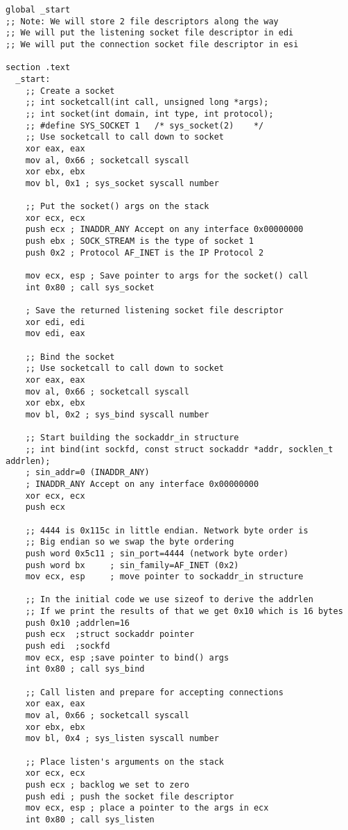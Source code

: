 \documentclass[11pt]{article}
\begin{document}
\begin{verbatim}
global _start
;; Note: We will store 2 file descriptors along the way
;; We will put the listening socket file descriptor in edi
;; We will put the connection socket file descriptor in esi

section .text
  _start:
    ;; Create a socket
    ;; int socketcall(int call, unsigned long *args);
    ;; int socket(int domain, int type, int protocol);
    ;; #define SYS_SOCKET 1   /* sys_socket(2)    */
    ;; Use socketcall to call down to socket
    xor eax, eax
    mov al, 0x66 ; socketcall syscall
    xor ebx, ebx
    mov bl, 0x1 ; sys_socket syscall number

    ;; Put the socket() args on the stack
    xor ecx, ecx
    push ecx ; INADDR_ANY Accept on any interface 0x00000000
    push ebx ; SOCK_STREAM is the type of socket 1
    push 0x2 ; Protocol AF_INET is the IP Protocol 2

    mov ecx, esp ; Save pointer to args for the socket() call
    int 0x80 ; call sys_socket

    ; Save the returned listening socket file descriptor
    xor edi, edi
    mov edi, eax

    ;; Bind the socket
    ;; Use socketcall to call down to socket
    xor eax, eax
    mov al, 0x66 ; socketcall syscall
    xor ebx, ebx
    mov bl, 0x2 ; sys_bind syscall number

    ;; Start building the sockaddr_in structure
    ;; int bind(int sockfd, const struct sockaddr *addr, socklen_t addrlen);
    ; sin_addr=0 (INADDR_ANY)
    ; INADDR_ANY Accept on any interface 0x00000000
    xor ecx, ecx
    push ecx

    ;; 4444 is 0x115c in little endian. Network byte order is
    ;; Big endian so we swap the byte ordering
    push word 0x5c11 ; sin_port=4444 (network byte order)
    push word bx     ; sin_family=AF_INET (0x2)
    mov ecx, esp     ; move pointer to sockaddr_in structure

    ;; In the initial code we use sizeof to derive the addrlen
    ;; If we print the results of that we get 0x10 which is 16 bytes
    push 0x10 ;addrlen=16
    push ecx  ;struct sockaddr pointer
    push edi  ;sockfd
    mov ecx, esp ;save pointer to bind() args
    int 0x80 ; call sys_bind

    ;; Call listen and prepare for accepting connections
    xor eax, eax
    mov al, 0x66 ; socketcall syscall
    xor ebx, ebx
    mov bl, 0x4 ; sys_listen syscall number

    ;; Place listen's arguments on the stack
    xor ecx, ecx
    push ecx ; backlog we set to zero
    push edi ; push the socket file descriptor
    mov ecx, esp ; place a pointer to the args in ecx
    int 0x80 ; call sys_listen


\end{verbatim}
\end{document}

